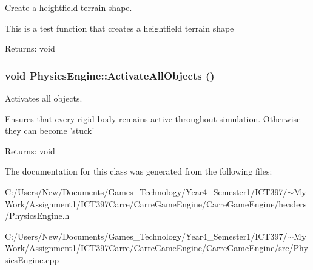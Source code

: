 Create a heightfield terrain shape. 

This is a test function that creates a heightfield terrain shape

\begin{Desc}
\item[Returns:]void \end{Desc}
\hypertarget{class_physics_engine_2e877a86ca85b2ec58b3c046af057d76}{
\subsubsection[ActivateAllObjects]{\setlength{\rightskip}{0pt plus 5cm}void PhysicsEngine::ActivateAllObjects ()}}
\label{class_physics_engine_2e877a86ca85b2ec58b3c046af057d76}


Activates all objects. 

Ensures that every rigid body remains active throughout simulation. Otherwise they can become 'stuck'

\begin{Desc}
\item[Returns:]void \end{Desc}


The documentation for this class was generated from the following files:\begin{CompactItemize}
\item 
C:/Users/New/Documents/Games\_\-Technology/Year4\_\-Semester1/ICT397/$\sim$My Work/Assignment1/ICT397Carre/CarreGameEngine/CarreGameEngine/headers/PhysicsEngine.h\item 
C:/Users/New/Documents/Games\_\-Technology/Year4\_\-Semester1/ICT397/$\sim$My Work/Assignment1/ICT397Carre/CarreGameEngine/CarreGameEngine/src/PhysicsEngine.cpp\end{CompactItemize}
